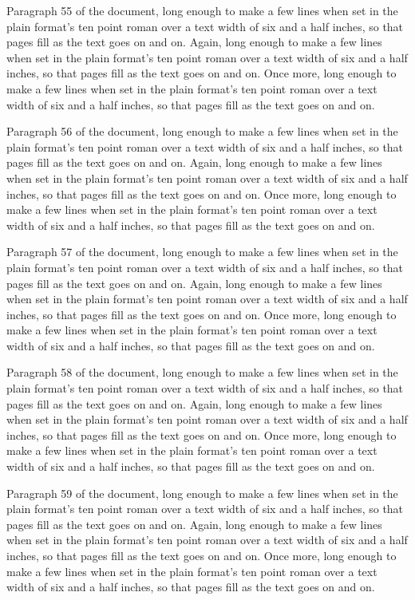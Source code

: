 Paragraph 55 of the document, long enough to make a few lines when set in the plain format's ten point roman over a text width of six and a half inches, so that pages fill as the text goes on and on. Again, long enough to make a few lines when set in the plain format's ten point roman over a text width of six and a half inches, so that pages fill as the text goes on and on. Once more, long enough to make a few lines when set in the plain format's ten point roman over a text width of six and a half inches, so that pages fill as the text goes on and on.

Paragraph 56 of the document, long enough to make a few lines when set in the plain format's ten point roman over a text width of six and a half inches, so that pages fill as the text goes on and on. Again, long enough to make a few lines when set in the plain format's ten point roman over a text width of six and a half inches, so that pages fill as the text goes on and on. Once more, long enough to make a few lines when set in the plain format's ten point roman over a text width of six and a half inches, so that pages fill as the text goes on and on.

Paragraph 57 of the document, long enough to make a few lines when set in the plain format's ten point roman over a text width of six and a half inches, so that pages fill as the text goes on and on. Again, long enough to make a few lines when set in the plain format's ten point roman over a text width of six and a half inches, so that pages fill as the text goes on and on. Once more, long enough to make a few lines when set in the plain format's ten point roman over a text width of six and a half inches, so that pages fill as the text goes on and on.

Paragraph 58 of the document, long enough to make a few lines when set in the plain format's ten point roman over a text width of six and a half inches, so that pages fill as the text goes on and on. Again, long enough to make a few lines when set in the plain format's ten point roman over a text width of six and a half inches, so that pages fill as the text goes on and on. Once more, long enough to make a few lines when set in the plain format's ten point roman over a text width of six and a half inches, so that pages fill as the text goes on and on.

Paragraph 59 of the document, long enough to make a few lines when set in the plain format's ten point roman over a text width of six and a half inches, so that pages fill as the text goes on and on. Again, long enough to make a few lines when set in the plain format's ten point roman over a text width of six and a half inches, so that pages fill as the text goes on and on. Once more, long enough to make a few lines when set in the plain format's ten point roman over a text width of six and a half inches, so that pages fill as the text goes on and on.

